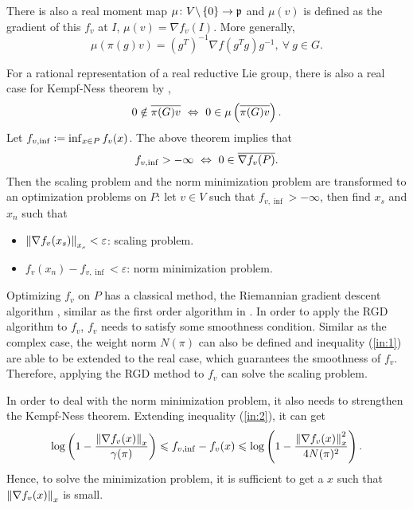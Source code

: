 \documentclass[suri,pdfbookmark]{engsuribt} %
\begin{document}
  There is also a real moment map \cite{key25} $\mu \colon V\backslash \left\{0\right\} \rightarrow \mathfrak{p}$ and $\mu(v)$ is defined as the gradient of this $f_v$ at $I$, $\mu(v) = \nabla f_v(I)$. More generally, 
  \begin{equation*}
    \mu(\pi(g)v) = (g^T)^{-1}\nabla f(g^Tg) g^{-1},~\forall~g \in G.
  \end{equation*}

  For a rational representation of a real reductive Lie group, there is also a real case for Kempf-Ness theorem by \cite{key5},
  \begin{equation*}
    0 \notin \overline{\pi(G)v} ~\Leftrightarrow~ 0 \in \mu\left(\overline{\pi(G)v}\right).
  \end{equation*}
  Let $f_{v,\inf} \vcentcolon= \inf_{x \in P}f_v(x)$. The above theorem implies that
  \begin{equation*}
    f_{v,\inf} > -\infty ~\Leftrightarrow~ 0 \in \overline{\nabla f_v(P)}.
  \end{equation*}
  Then the scaling problem and the norm minimization problem are transformed to an optimization problems on $P$: let $v \in V$ such that $f_{v,\inf} > -\infty$, then find $x_s$ and $x_n$ such that
  \begin{itemize}
    \item $\left\lVert\nabla f_v(x_s)\right\lVert_{x_s} < \varepsilon$: scaling problem.
    \item $f_v(x_n) - f_{v,\inf} < \varepsilon$: norm minimization problem.
  \end{itemize}

  Optimizing $f_v$ on $P$ has a classical method, the Riemannian gradient descent algorithm \cite{key7}, similar as the first order algorithm in \cite{key8}. In order to apply the RGD algorithm to $f_v$, $f_v$ needs to satisfy some smoothness condition. Similar as the complex case, the weight norm $N(\pi)$ can also be defined and inequality (\ref{in:1}) are able to be extended to the real case, which guarantees the smoothness of $f_v$. Therefore, applying the RGD method to $f_v$ can solve the scaling problem.

  In order to deal with the norm minimization problem, it also needs to strengthen the Kempf-Ness theorem. Extending inequality (\ref{in:2}), it can get
  \begin{equation*}
    \log\left(1-\frac{\left\lVert\nabla f_v(x)\right\lVert_{x}}{\gamma(\pi)}\right) \leqslant f_{v,\inf}- f_v(x) \leqslant \log\left(1-\frac{\left\lVert\nabla f_v(x)\right\lVert_{x}^2}{4N(\pi)^2}\right).
  \end{equation*}
  Hence, to solve the minimization problem, it is sufficient to get a $x$ such that $\left\lVert\nabla f_v(x)\right\lVert_{x}$ is small. 
\end{document}
